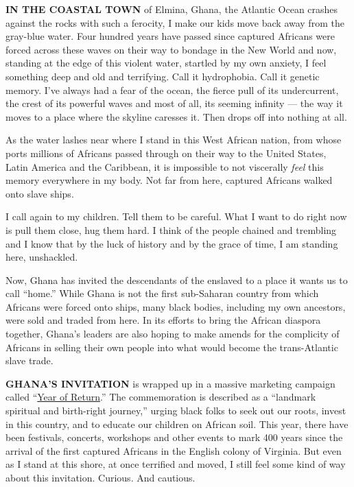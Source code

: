 \textbf{IN THE COASTAL TOWN} of Elmina, Ghana, the Atlantic Ocean
crashes against the rocks with such a ferocity, I make our kids move
back away from the gray-blue water. Four hundred years have passed since
captured Africans were forced across these waves on their way to bondage
in the New World and now, standing at the edge of this violent water,
startled by my own anxiety, I feel something deep and old and
terrifying. Call it hydrophobia. Call it genetic memory. I've always had
a fear of the ocean, the fierce pull of its undercurrent, the crest of
its powerful waves and most of all, its seeming infinity --- the way it
moves to a place where the skyline caresses it. Then drops off into
nothing at all.

As the water lashes near where I stand in this West African nation, from
whose ports millions of Africans passed through on their way to the
United States, Latin America and the Caribbean, it is impossible to not
viscerally \emph{feel} this memory everywhere in my body. Not far from
here, captured Africans walked onto slave ships.

I call again to my children. Tell them to be careful. What I want to do
right now is pull them close, hug them hard. I think of the people
chained and trembling and I know that by the luck of history and by the
grace of time, I am standing here, unshackled.

Now, Ghana has invited the descendants of the enslaved to a place it
wants us to call ``home.'' While Ghana is not the first sub-Saharan
country from which Africans were forced onto ships, many black bodies,
including my own ancestors, were sold and traded from here. In its
efforts to bring the African diaspora together, Ghana's leaders are also
hoping to make amends for the complicity of Africans in selling their
own people into what would become the trans-Atlantic slave trade.

\textbf{GHANA'S INVITATION} is wrapped up in a massive marketing
campaign called ``\href{https://www.yearofreturn.com/}{Year of
Return}.'' The commemoration is described as a ``landmark spiritual and
birth-right journey,'' urging black folks to seek out our roots, invest
in this country, and to educate our children on African soil. This year,
there have been festivals, concerts, workshops and other events to mark
400 years since the arrival of the first captured Africans in the
English colony of Virginia. But even as I stand at this shore, at once
terrified and moved, I still feel some kind of way about this
invitation. Curious. And cautious.

